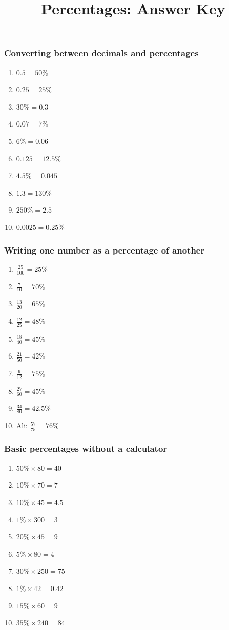 \documentclass{beamer}
\title{Percentages: Answer Key}
\author{}
\date{}
\begin{document}
\frame{\titlepage}

\begin{frame}[shrink=15]
\frametitle{Converting between decimals and percentages}
\footnotesize
\begin{enumerate}\setlength{\itemsep}{1pt}
\item \(0.5=50\%\)
\item \(0.25=25\%\)
\item \(30\%=0.3\)
\item \(0.07=7\%\)
\item \(6\%=0.06\)
\item \(0.125=12.5\%\)
\item \(4.5\%=0.045\)
\item \(1.3=130\%\)
\item \(250\%=2.5\)
\item \(0.0025=0.25\%\)
\end{enumerate}
\end{frame}

\begin{frame}[shrink=15]
\frametitle{Writing one number as a percentage of another}
\footnotesize
\begin{enumerate}\setlength{\itemsep}{1pt}
\item \(\frac{25}{100}=25\%\)
\item \(\frac{7}{10}=70\%\)
\item \(\frac{13}{20}=65\%\)
\item \(\frac{12}{25}=48\%\)
\item \(\frac{18}{40}=45\%\)
\item \(\frac{21}{50}=42\%\)
\item \(\frac{9}{12}=75\%\)
\item \(\frac{27}{60}=45\%\)
\item \(\frac{34}{80}=42.5\%\)
\item Ali: \(\frac{57}{75}=76\%\)
\end{enumerate}
\end{frame}

\begin{frame}[shrink=15]
\frametitle{Basic percentages without a calculator}
\footnotesize
\begin{enumerate}\setlength{\itemsep}{1pt}
\item \(50\%\times 80=40\)
\item \(10\%\times 70=7\)
\item \(10\%\times 45=4.5\)
\item \(1\%\times 300=3\)
\item \(20\%\times 45=9\)
\item \(5\%\times 80=4\)
\item \(30\%\times 250=75\)
\item \(1\%\times 42=0.42\)
\item \(15\%\times 60=9\)
\item \(35\%\times 240=84\)
\end{enumerate}
\end{frame}
\end{document}
